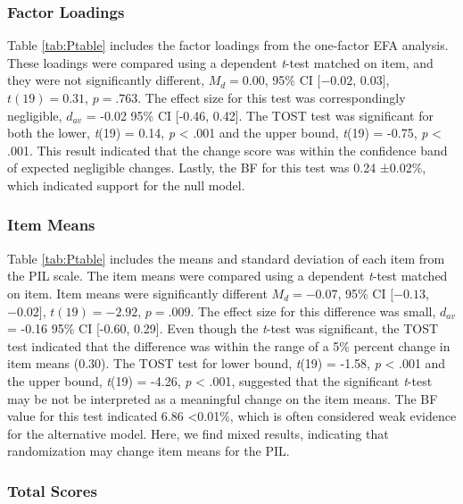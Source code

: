 \documentclass[english,man, mask]{apa6}
\theoremstyle{definition}
\theoremstyle{definition}
\theoremstyle{definition}
\theoremstyle{remark}
\begin{document}
\subsubsection{Factor Loadings}\label{factor-loadings}

Table \ref{tab:Ptable} includes the factor loadings from the one-factor
EFA analysis. These loadings were compared using a dependent
\emph{t}-test matched on item, and they were not significantly
different, \(M_d = 0.00\), 95\% CI \([-0.02\), \(0.03]\),
\(t(19) = 0.31\), \(p = .763\). The effect size for this test was
correspondingly negligible, \(d_{av}\) = -0.02 95\% CI {[}-0.46,
0.42{]}. The TOST test was significant for both the lower, \emph{t}(19)
= 0.14, \emph{p} \textless{} .001 and the upper bound, \emph{t}(19) =
-0.75, \emph{p} \textless{} .001. This result indicated that the change
score was within the confidence band of expected negligible changes.
Lastly, the BF for this test was 0.24 ±0.02\%, which indicated support
for the null model.

\subsubsection{Item Means}\label{item-means}

Table \ref{tab:Ptable} includes the means and standard deviation of each
item from the PIL scale. The item means were compared using a dependent
\emph{t}-test matched on item. Item means were significantly different
\(M_d = -0.07\), 95\% CI \([-0.13\), \(-0.02]\), \(t(19) = -2.92\),
\(p = .009\). The effect size for this difference was small, \(d_{av}\)
= -0.16 95\% CI {[}-0.60, 0.29{]}. Even though the \emph{t}-test was
significant, the TOST test indicated that the difference was within the
range of a 5\% percent change in item means (0.30). The TOST test for
lower bound, \emph{t}(19) = -1.58, \emph{p} \textless{} .001 and the
upper bound, \emph{t}(19) = -4.26, \emph{p} \textless{} .001, suggested
that the significant \emph{t}-test may be not be interpreted as a
meaningful change on the item means. The BF value for this test
indicated 6.86 \textless{}0.01\%, which is often considered weak
evidence for the alternative model. Here, we find mixed results,
indicating that randomization may change item means for the PIL.

\subsubsection{Total Scores}\label{total-scores}
\end{document}
